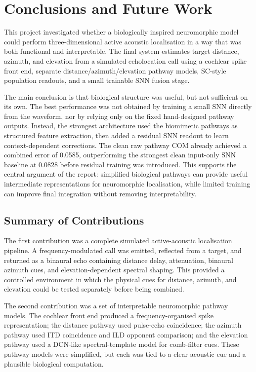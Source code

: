 \chapter{Conclusions and Future Work} \label{ch:conclusions}

This project investigated whether a biologically inspired neuromorphic model could perform three-dimensional active acoustic localisation in a way that was both functional and interpretable. The final system estimates target distance, azimuth, and elevation from a simulated echolocation call using a cochlear spike front end, separate distance/azimuth/elevation pathway models, SC-style population readouts, and a small trainable SNN fusion stage.

The main conclusion is that biological structure was useful, but not sufficient on its own. The best performance was not obtained by training a small SNN directly from the waveform, nor by relying only on the fixed hand-designed pathway outputs. Instead, the strongest architecture used the biomimetic pathways as structured feature extraction, then added a residual SNN readout to learn context-dependent corrections. The clean raw pathway COM already achieved a combined error of 0.0585, outperforming the strongest clean input-only SNN baseline at 0.0828 before residual training was introduced. This supports the central argument of the report: simplified biological pathways can provide useful intermediate representations for neuromorphic localisation, while limited training can improve final integration without removing interpretability.

\section{Summary of Contributions}

The first contribution was a complete simulated active-acoustic localisation pipeline. A frequency-modulated call was emitted, reflected from a target, and returned as a binaural echo containing distance delay, attenuation, binaural azimuth cues, and elevation-dependent spectral shaping. This provided a controlled environment in which the physical cues for distance, azimuth, and elevation could be tested separately before being combined.

The second contribution was a set of interpretable neuromorphic pathway models. The cochlear front end produced a frequency-organised spike representation; the distance pathway used pulse-echo coincidence; the azimuth pathway used ITD coincidence and ILD opponent comparison; and the elevation pathway used a DCN-like spectral-template model for comb-filter cues. These pathway models were simplified, but each was tied to a clear acoustic cue and a plausible biological computation.

